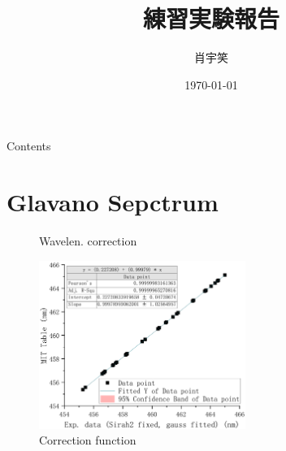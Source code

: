\documentclass[aspectratio=43,scheme=plain,handout,draft]{ctexbeamer}
\title{練習実験報告}
\author{肖宇笑}
\date{\today}
\begin{document}
%
%
%
%
%
\begin{frame}{Contents}
	\tableofcontents
\end{frame}
%
%
\section{Glavano Sepctrum}	
\begin{frame}{\insertsection}
	\begin{figure}[H]
		\centering
		\caption{Wavelen. correction}
	\end{figure}
\end{frame}
%	
%
\begin{frame}{\insertsection}
	\begin{figure}[H]
		\centering
		\includegraphics[width=0.6\textwidth]{fitfunc.pdf}
		\caption{Correction function}
	\end{figure}
\end{frame}
%	
%
\end{document}

